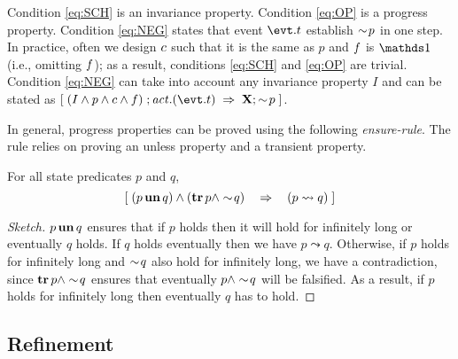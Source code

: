 Condition \eqref{eq:SCH} is an invariance property. Condition
\eqref{eq:OP} is a progress property.  Condition \eqref{eq:NEG} states
that event $\evt.t$ establish $\sim \! p$ in one step.  In practice,
often we design $c$ such that it is the same as $p$ and
$f$ is $\one$ (i.e., omitting $f$); as a result,
conditions \eqref{eq:SCH} and \eqref{eq:OP} are trivial.  Condition
\eqref{eq:NEG} can take into account any invariance property $I$ and
can be stated as $\ew{(I \land p \land \csched \land \fsched)\; ;
  \action.(\evt.t) ~\limp~ \X; \spneg p}$.

In general, progress properties can be proved using the following
\emph{ensure-rule}.  The rule relies on proving an unless property and
a transient property.
\begin{Theorem} For all state predicates $p$ and $q$,
  \label{thm:ensure-rule}
  \begin{equation}
    \label{eq:ensure-rule}
    [\; (p \mathop{\textbf{un}} q) \land (\mathop{\textbf{tr}} p \land \sim \! q)  ~~~\mathbin\Rightarrow~~~ (p \leadsto q) \;]
  \end{equation}
\end{Theorem}
\begin{proof}[Sketch]
  $p \mathop{\textbf{un}} q$ ensures that if $p$ holds then it will hold for infinitely long or
  eventually $q$ holds.  If $q$ holds eventually then we have $p
  \leadsto q$.  Otherwise, if $p$ holds for infinitely long and $\sim \! q$
  also hold for infinitely long, we have a contradiction, since $\mathop{\textbf{tr}} p \land
  \sim \! q$ ensures that eventually $p \land \sim \! q$ will be
  falsified.  As a result, if $p$ holds for infinitely long then eventually
  $q$ has to hold.
\end{proof}

\subsection{Refinement}
\label{sec:refinement}

